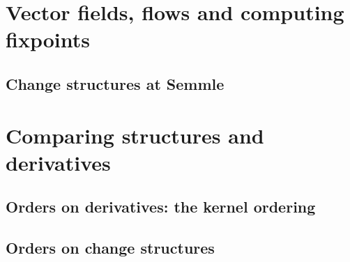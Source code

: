 \documentclass[english]{beamer}
\theoremstyle{plain}
\theoremstyle{remark}
\theoremstyle{remark}
\theoremstyle{remark}
\theoremstyle{definition}
\theoremstyle{definition}
\begin{document}
\section{Vector fields, flows and computing fixpoints}

\subsection{Change structures at Semmle}

\section{Comparing structures and derivatives}

\subsection{Orders on derivatives: the kernel ordering}

\subsection{Orders on change structures}
\end{document}
